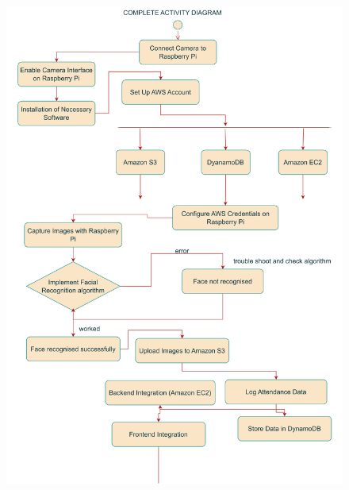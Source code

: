 \documentclass[11pt]{article}
\begin{document}
\begin{figure}[H]
    \centering
    \includegraphics[width=.90\textwidth]{activity_AA.drawio-2.png}
\end{figure}
\end{document}
